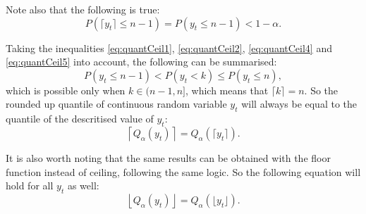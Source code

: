 \documentclass[]{elsarticle} %
\begin{document}
Note also that the following is true:
\begin{equation} \label{eq:quantCeil5}
    P \left(\lceil y_t \rceil \leq n-1 \right) = P \left(y_t \leq n-1 \right) < 1 - \alpha .
\end{equation}

Taking the inequalities \eqref{eq:quantCeil1}, \eqref{eq:quantCeil2}, \eqref{eq:quantCeil4} and \eqref{eq:quantCeil5} into account, the following can be summarised:
\begin{equation} \label{eq:quantCeil6}
    P \left(y_t \leq n-1 \right) < P \left(y_t < k \right) \leq P \left(y_t \leq n \right) ,
\end{equation}
which is possible only when \(k \in (n-1, n]\), which means that \(\lceil k \rceil = n\). So the rounded up quantile of continuous random variable \(y_t\) will always be equal to the quantile of the descritised value of \(y_t\):
\begin{equation} \label{eq:ceilingAndQuantiles1}
    \left \lceil Q_\alpha(y_t) \right \rceil = Q_\alpha \left(\lceil y_t \rceil \right) .
\end{equation}

It is also worth noting that the same results can be obtained with the floor function instead of ceiling, following the same logic. So the following equation will hold for all \(y_t\) as well:
\begin{equation} \label{eq:floorAndQuantiles1}
    \left \lfloor Q_\alpha(y_t) \right \rfloor = Q_\alpha \left(\lfloor y_t \rfloor \right) .
\end{equation}

\renewcommand\refname{References}

\end{document}
